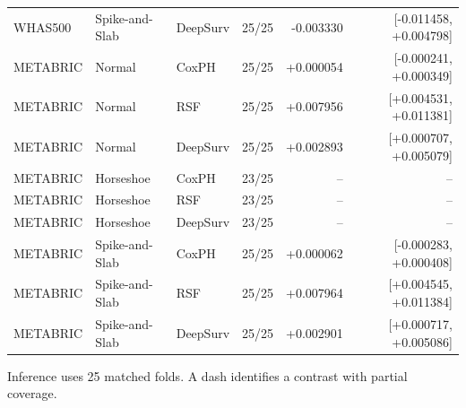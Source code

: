 \begin{longtable}{@{}lllr r r@{}}
WHAS500 & Spike-and-Slab & DeepSurv & 25/25 & -0.003330 & [-0.011458, +0.004798] \\
METABRIC & Normal & CoxPH & 25/25 & +0.000054 & [-0.000241, +0.000349] \\
METABRIC & Normal & RSF & 25/25 & +0.007956 & [+0.004531, +0.011381] \\
METABRIC & Normal & DeepSurv & 25/25 & +0.002893 & [+0.000707, +0.005079] \\
METABRIC & Horseshoe & CoxPH & 23/25 & -- & -- \\
METABRIC & Horseshoe & RSF & 23/25 & -- & -- \\
METABRIC & Horseshoe & DeepSurv & 23/25 & -- & -- \\
METABRIC & Spike-and-Slab & CoxPH & 25/25 & +0.000062 & [-0.000283, +0.000408] \\
METABRIC & Spike-and-Slab & RSF & 25/25 & +0.007964 & [+0.004545, +0.011384] \\
METABRIC & Spike-and-Slab & DeepSurv & 25/25 & +0.002901 & [+0.000717, +0.005086] \\
\end{longtable}
\noindent Inference uses 25 matched folds. A dash identifies a contrast with partial coverage.\par\endgroup
